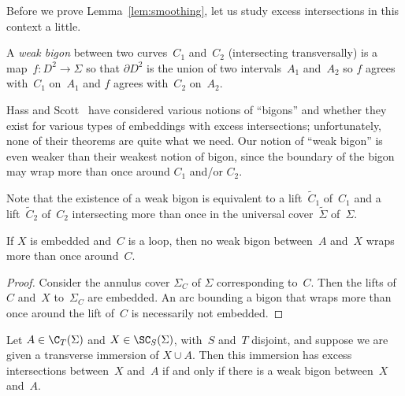 Before we prove Lemma~\ref{lem:smoothing}, let us study excess
intersections in this context a little.

\begin{definition}
  \label{def:weak-bigon}
  A \emph{weak bigon} between two curves~$C_1$ and~$C_2$ (intersecting
  transversally) is a
  map~$f:D^2\to\Sigma$ so that $\partial D^2$ is the union of two intervals~$A_1$
  and~$A_2$ so $f$ agrees with~$C_1$ on~$A_1$ and $f$ agrees
  with~$C_2$ on~$A_2$.
\end{definition}

Hass and Scott~\cite{HS85:IntersectionCurves} have considered various
notions of ``bigons'' and whether they exist for various types of
embeddings with excess intersections; unfortunately, none of their
theorems are quite what we need.  Our notion of ``weak bigon'' is even
weaker than their weakest notion of bigon, since the boundary of the
bigon may wrap more than once around $C_1$ and/or $C_2$.

Note that the existence of a weak bigon is equivalent to a
lift~$\tilde C_1$ of~$C_1$ and a lift~$\tilde C_2$ of~$C_2$
intersecting more than once in the universal cover~$\tilde \Sigma$ of~$\Sigma$.

\begin{lemma}\label{lem:bigon-wrap}
  If $X$ is embedded and~$C$ is a loop, then no weak bigon
  between~$A$ and~$X$ wraps more than once around~$C$.
\end{lemma}

\begin{proof}
  Consider the annulus cover $\Sigma_C$ of $\Sigma$ corresponding to~$C$.  Then
  the lifts of~$C$ and~$X$ to~$\Sigma_C$ are embedded.  An arc bounding a
  bigon that wraps more than once around the lift of~$C$ is
  necessarily not embedded.
\end{proof}

\begin{lemma}\label{lem:taut-simple-bigon}
  Let $A \in \C_T(\Sigma)$ and $X \in \SC_S(\Sigma)$, with~$S$ and~$T$
  disjoint, and
  suppose we are given a transverse immersion of $X \cup A$.  Then this
  immersion has excess intersections between~$X$ and~$A$ if and only
  if there is a weak bigon between~$X$ and~$A$.
\end{lemma}

